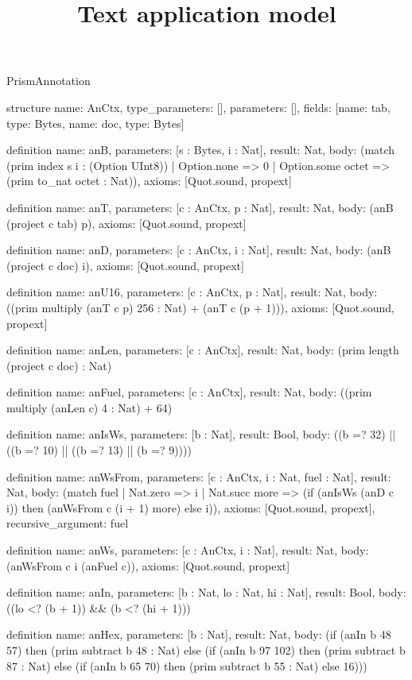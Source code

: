 \begin{lexlean}{PrismAnnotation}
\title{Text application model}
\begin{semanticmodule}
structure{
  name: AnCtx,
  type_parameters: [],
  parameters: [],
  fields: [{name: tab, type: Bytes}, {name: doc, type: Bytes}]
}

definition{
  name: anB,
  parameters: [s : Bytes, i : Nat],
  result: Nat,
  body: (match (prim index s i : (Option UInt8))
    | Option.none => 0
    | Option.some octet => (prim to_nat octet : Nat)),
  axioms: [Quot.sound, propext]
}

definition{
  name: anT,
  parameters: [c : AnCtx, p : Nat],
  result: Nat,
  body: (anB (project c tab) p),
  axioms: [Quot.sound, propext]
}

definition{
  name: anD,
  parameters: [c : AnCtx, i : Nat],
  result: Nat,
  body: (anB (project c doc) i),
  axioms: [Quot.sound, propext]
}

definition{
  name: anU16,
  parameters: [c : AnCtx, p : Nat],
  result: Nat,
  body: ((prim multiply (anT c p) 256 : Nat) + (anT c (p + 1))),
  axioms: [Quot.sound, propext]
}

definition{
  name: anLen,
  parameters: [c : AnCtx],
  result: Nat,
  body: (prim length (project c doc) : Nat)
}

definition{
  name: anFuel,
  parameters: [c : AnCtx],
  result: Nat,
  body: ((prim multiply (anLen c) 4 : Nat) + 64)
}

definition{
  name: anIsWs,
  parameters: [b : Nat],
  result: Bool,
  body: ((b =? 32) || ((b =? 10) || ((b =? 13) || (b =? 9))))
}

definition{
  name: anWsFrom,
  parameters: [c : AnCtx, i : Nat, fuel : Nat],
  result: Nat,
  body: (match fuel
    | Nat.zero => i
    | Nat.succ more => (if (anIsWs (anD c i)) then (anWsFrom c (i + 1) more) else i)),
  axioms: [Quot.sound, propext],
  recursive_argument: fuel
}

definition{
  name: anWs,
  parameters: [c : AnCtx, i : Nat],
  result: Nat,
  body: (anWsFrom c i (anFuel c)),
  axioms: [Quot.sound, propext]
}

definition{
  name: anIn,
  parameters: [b : Nat, lo : Nat, hi : Nat],
  result: Bool,
  body: ((lo <? (b + 1)) && (b <? (hi + 1)))
}

definition{
  name: anHex,
  parameters: [b : Nat],
  result: Nat,
  body: (if (anIn b 48 57) then (prim subtract b 48 : Nat) else (if (anIn b 97 102) then (prim subtract b 87 : Nat) else (if (anIn b 65 70) then (prim subtract b 55 : Nat) else 16)))
}


\end{semanticmodule}
\end{lexlean}
